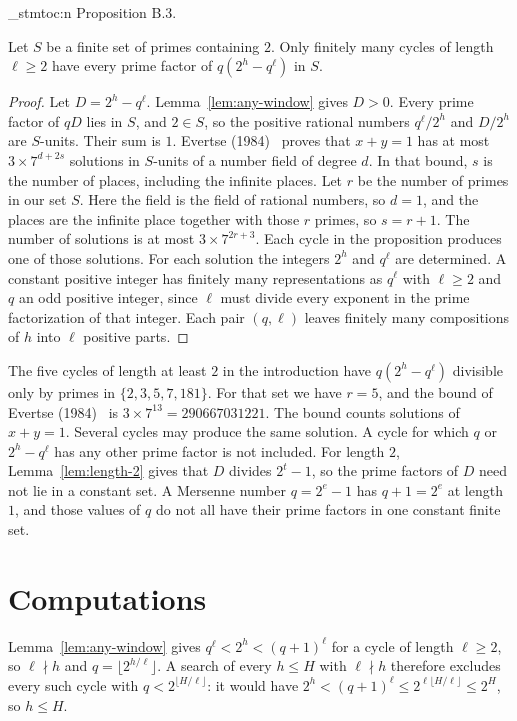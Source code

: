 \documentclass[11pt]{article}
\newenvironment{named}[1]{%
  \par\addvspace{\medskipamount}%
  \pagebreak[3]%
  \noindent{\bfseries #1}\space\ignorespaces
  \stmtoc{#1}%
}{\par\addvspace{\medskipamount}}
\newcommand{\stmtoc}[1]{ \qn_stmtoc:n {#1} }
\begin{document}
\begin{named}{Proposition B.3.}
Let $S$ be a finite set of primes containing $2$.
Only finitely many cycles of length $\ell \ge 2$ have every prime factor of $q(2^h - q^\ell)$ in $S$.
\end{named}

\begin{proof}
Let $D = 2^h - q^\ell$.
Lemma~\ref{lem:any-window} gives $D > 0$.
Every prime factor of $qD$ lies in $S$, and $2 \in S$, so the positive rational numbers $q^\ell/2^h$ and $D/2^h$ are $S$-units.
Their sum is $1$.
Evertse (1984)~\cite{evertse} proves that $x + y = 1$ has at most $3 \times 7^{d+2s}$ solutions in $S$-units of a number field of degree $d$.
In that bound, $s$ is the number of places, including the infinite places.
Let $r$ be the number of primes in our set $S$.
Here the field is the field of rational numbers, so $d = 1$, and the places are the infinite place together with those $r$ primes, so $s = r+1$.
The number of solutions is at most $3 \times 7^{2r+3}$.
Each cycle in the proposition produces one of those solutions.
For each solution the integers $2^h$ and $q^\ell$ are determined.
A constant positive integer has finitely many representations as $q^\ell$ with $\ell \ge 2$ and $q$ an odd positive integer, since $\ell$ must divide every exponent in the prime factorization of that integer.
Each pair $(q,\ell)$ leaves finitely many compositions of $h$ into $\ell$ positive parts.
\end{proof}

The five cycles of length at least $2$ in the introduction have $q(2^h - q^\ell)$ divisible only by primes in $\{2,3,5,7,181\}$.
For that set we have $r = 5$, and the bound of Evertse (1984)~\cite{evertse} is $3 \times 7^{13} = 290667031221$.
The bound counts solutions of $x + y = 1$.
Several cycles may produce the same solution.
A cycle for which $q$ or $2^h - q^\ell$ has any other prime factor is not included.
For length $2$, Lemma~\ref{lem:length-2} gives that $D$ divides $2^t - 1$, so the prime factors of $D$ need not lie in a constant set.
A Mersenne number $q = 2^e - 1$ has $q + 1 = 2^e$ at length $1$, and those values of $q$ do not all have their prime factors in one constant finite set.

\section{Computations}
\label{app:computations}

Lemma~\ref{lem:any-window} gives $q^\ell < 2^h < (q+1)^\ell$ for a cycle of length $\ell \ge 2$, so $\ell \nmid h$ and $q = \lfloor 2^{h/\ell}\rfloor$.
A search of every $h \le H$ with $\ell \nmid h$ therefore excludes every such cycle with $q < 2^{\lfloor H/\ell \rfloor}$: it would have $2^h < (q+1)^\ell \le 2^{\ell \lfloor H/\ell \rfloor} \le 2^H$, so $h \le H$.
\end{document}
